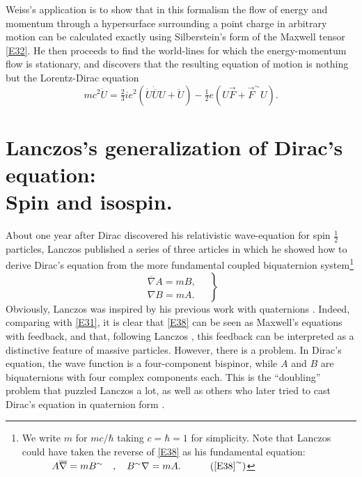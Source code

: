 \documentclass [12pt,a4paper      ]{article}
\newcommand{\CON}{\overline}          %
\newcommand{\REV}{\sim}               %
\begin{document}
     Weiss's application is to show that in this formalism the flow 
of energy and momentum through a hypersurface surrounding a point 
charge  in  arbitrary  motion  can be  calculated  exactly  using 
Silberstein's form of the Maxwell tensor \eqref{E32}.   He then proceeds 
to  find  the world-lines for which the energy-momentum  flow  is 
stationary,  and discovers that the resulting equation of  motion 
is nothing but the Lorentz-Dirac equation \cite{R25}
%
\begin{equation}\label{E37}
 mc^2 \dot{U} = \tfrac{2}{3} i e^2(\dot{U} \dot{\CON{U}} U + \ddot{U}) -\tfrac{1}{2} e(U \vec{F} + \vec{F}^\REV U). %
\end{equation}
%


\section{Lanczos's generalization of Dirac's equation:\\ Spin and isospin.}
\label{lan:0}

     About  one  year  after  Dirac discovered  his  relativistic 
wave-equation for spin $\tfrac{1}{2}$ particles,  Lanczos \cite{R26} published a 
series of three articles in which he showed how to derive Dirac's 
equation from the more fundamental coupled biquaternion system\footnote{We write $m$ for $mc/ \hbar$  taking  $c=\hbar=1$ for  simplicity. Note that Lanczos could have taken the reverse of \eqref{E38} as his fundamental equation:$~~~ ~~~ ~~~ A \CON{\nabla} = m B^\REV  ~~~ , ~~~ B^\REV\nabla = m A. ~~~ ~~~ ~~~ (\ref{E38}^\REV)$ }
%
\begin{equation}\label{E38}
\left.
\begin{array}{c}
\CON{\nabla} A = m B, \\    %
\nabla B = m A.
\end{array}
\quad \right\}
\end{equation}
%
Obviously,  Lanczos  was  inspired  by  his  previous  work  with 
quaternions \cite{R18}.  Indeed,  comparing with \eqref{E31}, it is clear that \eqref{E38} 
can  be  seen  as Maxwell's equations with  feedback,  and  that, 
following  Lanczos \cite{R27},  this feedback can be interpreted  as  a 
distinctive  feature  of massive  particles.  However,  there  is 
a problem. In Dirac's equation, the wave function is a four-component 
bispinor,  while  $A$ and $B$ are biquaternions with  four 
complex  components each.   This is the ``doubling''  problem  that 
puzzled  Lanczos  a lot,  as well as  others who later tried  to 
cast Dirac's equation in quaternion form \cite{R28}.
\end{document}
